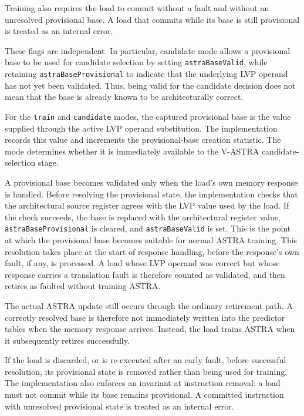 Training also requires the load to commit without a fault and
without an unresolved provisional base. A load that commits while
its base is still provisional is treated as an internal error.

These flags are independent. In particular, candidate mode allows
a provisional base to be used for candidate selection by setting
\texttt{astraBase\allowbreak Valid}, while retaining
\texttt{astraBase\allowbreak Provisional} to indicate that the underlying LVP
operand has not yet been validated. Thus, being valid for the
candidate decision does not mean that the base is already known
to be architecturally correct.

For the \texttt{train} and \texttt{candidate} modes, the captured
provisional base is the value supplied through the active LVP
operand substitution. The implementation records this value and
increments the provisional-base creation statistic. The mode
determines whether it is immediately available to the
V-ASTRA candidate-selection stage.

A provisional base becomes validated only when the load's own
memory response is handled. Before resolving the provisional
state, the implementation checks that the architectural source
register agrees with the LVP value used by the load. If the check
succeeds, the base is replaced with the architectural register
value, \texttt{astraBaseProvisional} is cleared, and
\texttt{astraBaseValid} is set. This is the point at which the
provisional base becomes suitable for normal ASTRA training.
This resolution takes place at the start of response handling,
before the response's own fault, if any, is processed. A load whose
LVP operand was correct but whose response carries a translation
fault is therefore counted as validated, and then retires as faulted
without training ASTRA.

The actual ASTRA update still occurs through the ordinary
retirement path. A correctly resolved base is therefore not
immediately written into the predictor tables when the memory
response arrives. Instead, the load trains ASTRA when it
subsequently retires successfully.

If the load is discarded, or is re-executed after an early fault,
before successful resolution, its provisional state is removed
rather than being used for training. The implementation also enforces an invariant at
instruction removal: a load must not commit while its base remains
provisional. A committed instruction with unresolved provisional
state is treated as an internal error.

